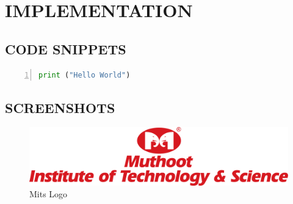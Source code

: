 \chapter{IMPLEMENTATION}

\section{CODE SNIPPETS}
\noindent

\begin{lstlisting}[language=Python, caption=Hello World, numbers=left, breaklines=true]
   print ("Hello World")
\end{lstlisting}

\newpage

\section{SCREENSHOTS}
\begin{figure}[hbtp]
    \centering
    \includegraphics[width=\textwidth]{images/MITS.png}
    \caption{Mits Logo}
\end{figure}
